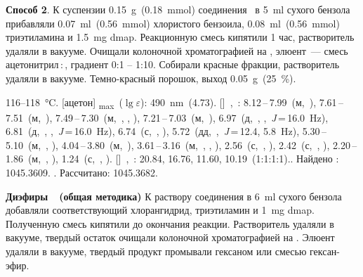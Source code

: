 \textbf{Способ 2}. К суспензии \SI{0.15}{\gram}~(\SI{0.18}{\mmol}) соединения~\textbf{} в \SI{5}{\milli\litre} сухого бензола прибавляли \SI{0.07}{\milli\litre}~(\SI{0.56}{\mmol}) хлористого бензоила, \SI{0.08}{\milli\litre}~(\SI{0.56}{\mmol}) триэтиламина и \SI{1.5}{\milli\gram} \ac{dmap}.
Реакционную смесь кипятили 1 час, растворитель удаляли в вакууме.
Очищали колоночной хроматографией на , элюент~--- смесь ацетонитрил\,:\,, градиент 0:1 -- 1:10.
Собирали красные фракции, растворитель удаляли в вакууме. Темно-красный порошок, выход \SI{0.05}{\gram}~(\SI{25}{\percent}).
\begin{experimental}
     116--\SI{118}{\celsius}.
    [ацетон] \chemlambda\textsubscript{max}~($\lg \varepsilon$): \SI{490}{\nano\metre}~(4.73).
    []~\chemdelta,~\si{\ppm}: 8.12\,--\,7.99~(м,~), 7.61\,--\,7.51~(м,~), 7.49\,--\,7.30~(м,~, , ), 7.21\,--\,7.03~(м,~), 6.97~(д,~, ,~\textit{J}\,=\,16.0~\si{\hertz}), 6.81~(д,~, ,~\textit{J}\,=\,16.0~\si{\hertz}), 6.74~(с,~, ), 5.72~(дд,~,~\textit{J}\,=\,12.4, 5.8~\si{\hertz}), 5.30\,--\,5.10~(м,~, ), 4.04\,--\,3.80~(м,~), 3.61\,--\,3.16~(м,~, , ), 2.56~(с,~, ), 2.42~(с,~, ), 2.20\,--\,1.86~(м,~, ), 1.24~(с,~, ).
    []~\chemdelta,~\si{\ppm}: 20.84, 16.76, 11.60, 10.19~(1:1:1:1)..
     Найдено \ce{[M + H]+}: \num{1045.3609}. . Рассчитано: \ce{[M + H]} \num{1045.3682}.
\end{experimental}

\textbf{Диэфиры~~(общая методика)}
К раствору соединения  в \SI{6}{\milli\litre} сухого бензола добавляли соответствующий хлорангидрид, триэтиламин и \SI{1}{\milli\gram} \ac{dmap}.
Полученную смесь кипятили до окончания реакции.
Растворитель удаляли в вакууме, твердый остаток очищали колоночной хроматографией на .
Элюент удаляли в вакууме, твердый продукт промывали гексаном или смесью гексан-эфир.

